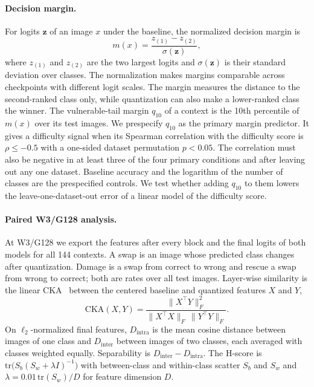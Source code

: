 \paragraph{Decision margin.}
For logits $\bm{z}$ of an image $x$ under the baseline, the normalized decision margin is
\begin{equation}
  m(x) = \frac{z_{(1)} - z_{(2)}}{\sigma(\bm{z})},
  \label{eq:margin}
\end{equation}
where $z_{(1)}$ and $z_{(2)}$ are the two largest logits and $\sigma(\bm{z})$ is their standard deviation over classes.
The normalization makes margins comparable across checkpoints with different logit scales.
The margin measures the distance to the second-ranked class only, while quantization can also make a lower-ranked class the winner.
The vulnerable-tail margin $q_{10}$ of a context is the 10th percentile of $m(x)$ over its test images.
We prespecify $q_{10}$ as the primary margin predictor.
It gives a difficulty signal when its Spearman correlation with the difficulty score is $\rho \le -0.5$ with a one-sided dataset permutation $p < 0.05$.
The correlation must also be negative in at least three of the four primary conditions and after leaving out any one dataset.
Baseline accuracy and the logarithm of the number of classes are the prespecified controls.
We test whether adding $q_{10}$ to them lowers the leave-one-dataset-out error of a linear model of the difficulty score.

\paragraph{Paired W3/G128 analysis.}
At W3/G128 we export the features after every block and the final logits of both models for all 144 contexts.
A swap is an image whose predicted class changes after quantization.
Damage is a swap from correct to wrong and rescue a swap from wrong to correct; both are rates over all test images.
Layer-wise similarity is the linear CKA~\cite{kornblith2019similarity} between the centered baseline and quantized features $X$ and $Y$,
\begin{equation}
  \mathrm{CKA}(X, Y) = \frac{\lVert X^{\top} Y \rVert_F^2}{\lVert X^{\top} X \rVert_F \, \lVert Y^{\top} Y \rVert_F}.
  \label{eq:cka}
\end{equation}
On $\ell_2$-normalized final features, $D_{\mathrm{intra}}$ is the mean cosine distance between images of one class and $D_{\mathrm{inter}}$ between images of two classes, each averaged with classes weighted equally.
Separability is $D_{\mathrm{inter}} - D_{\mathrm{intra}}$.
The H-score is $\mathrm{tr}\big(S_b (S_w + \lambda I)^{-1}\big)$ with between-class and within-class scatter $S_b$ and $S_w$ and $\lambda = 0.01\,\mathrm{tr}(S_w)/D$ for feature dimension $D$.

